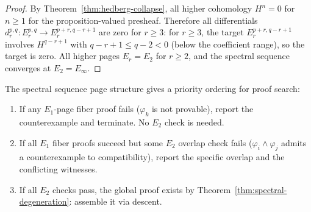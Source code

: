 \begin{proof}
By Theorem~\ref{thm:hedberg-collapse}, all higher cohomology
$H^n = 0$ for $n \ge 1$ for the proposition-valued presheaf.  Therefore
all differentials $d_r^{p,q} : E_r^{p,q} \to E_r^{p+r, q-r+1}$ are zero
for $r \ge 3$: for $r \ge 3$, the target $E_r^{p+r,q-r+1}$ involves
$H^{q-r+1}$ with $q - r + 1 \le q - 2 < 0$ (below the coefficient
range), so the target is zero.  All higher pages $E_r = E_2$ for $r \ge 2$,
and the spectral sequence converges at $E_2 = E_\infty$.
\end{proof}

\begin{proposition}
\label{prop:priority-ordering}
The spectral sequence page structure gives a priority ordering for
proof search:
\begin{enumerate}
\item If any $E_1$-page fiber proof fails ($\varphi_k$ is not provable),
  report the counterexample and terminate.  No $E_2$ check is needed.
\item If all $E_1$ fiber proofs succeed but some $E_2$ overlap check
  fails ($\varphi_i \wedge \varphi_j$ admits a counterexample to
  compatibility), report the specific overlap and the conflicting
  witnesses.
\item If all $E_2$ checks pass, the global proof exists by
  Theorem~\ref{thm:spectral-degeneration}: assemble it via descent.
\end{enumerate}
\end{proposition}

